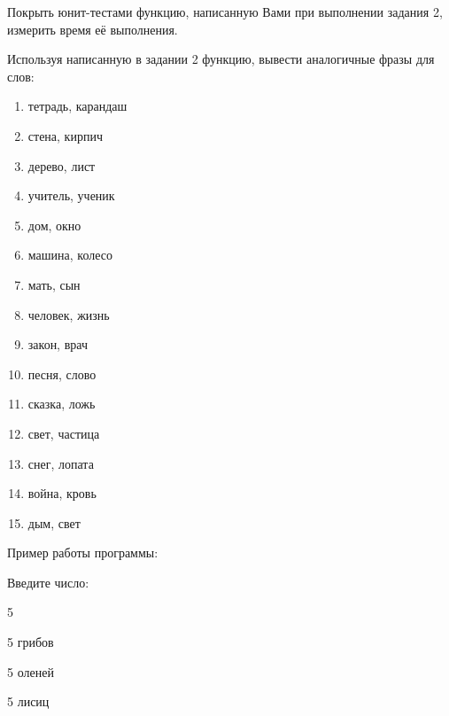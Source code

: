 \labtask

Покрыть юнит-тестами функцию, написанную Вами при выполнении задания 2, измерить время её выполнения.

\labtask

Используя написанную в задании 2 функцию, вывести аналогичные фразы для слов:

\begin{enumerate}

\item 	тетрадь, карандаш

\item 	стена, кирпич

\item 	дерево, лист

\item 	учитель, ученик

\item 	дом, окно

\item 	машина, колесо

\item 	мать, сын

\item 	человек, жизнь

\item 	закон, врач

\item 	песня, слово

\item 	сказка, ложь

\item 	 свет, частица

\item 	снег, лопата

\item 	война, кровь

\item 	дым, свет


\end{enumerate}

Пример работы программы:

Введите число:

5

5 грибов

5 оленей

5 лисиц  

